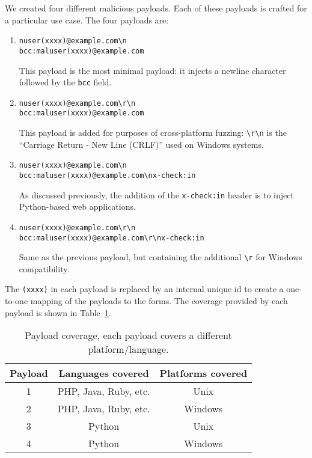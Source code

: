 We created four different malicious payloads. Each of these payloads is crafted for a particular use case. The four payloads are:

\begin{enumerate}
	\item
	\texttt{nuser(xxxx)@example.com\textbackslash{}n\\bcc:maluser(xxxx)@example.com} 
	
	This payload is the most minimal payload: it injects a newline character followed by the \texttt{bcc} field.
	
	\item \texttt{nuser(xxxx)@example.com\textbackslash{}r\textbackslash{}n\\bcc:maluser(xxxx)@example.com}
	
	This payload is added for purposes of cross-platform fuzzing: \texttt{\textbackslash{}r\textbackslash{}n} is the ``Carriage Return - New Line (CRLF)'' used on Windows systems.~\cite{rfc2616}
	
	\item \texttt{nuser(xxxx)@example.com\textbackslash{}n\\bcc:maluser(xxxx)@example.com\textbackslash{}nx-check:in}
	
	As discussed previously, the addition of the \texttt{x-check:in} header is to inject Python-based web applications.
	
	\item \texttt{nuser(xxxx)@example.com\textbackslash{}r\textbackslash{}n\\bcc:maluser(xxxx)@example.com\textbackslash{}r\textbackslash{}nx-check:in}
	
	Same as the previous payload, but containing the additional \texttt{\textbackslash{}r} for Windows compatibility.
	
\end{enumerate}
The \texttt{(xxxx)} in each payload is replaced by an internal unique id to create a one-to-one mapping of the payloads to the forms.
The coverage provided by each payload is shown in Table~\ref{tab:payloadcov}.\\

\begin{table}[tbp]
	\centering
	\begin{tabular}{|c|c|c|}
		\hline
		\multicolumn{1}{|c|}{\textbf{Payload}} & \multicolumn{1}{c}{\textbf{Languages covered}} & \multicolumn{1}{|c|}{\textbf{Platforms covered}}\\
		\hline
		1 & PHP, Java, Ruby, etc. & Unix\\
		\hline
		2 & PHP, Java, Ruby, etc. & Windows\\
		\hline
		3 & Python & Unix\\
		\hline
		4 & Python & Windows\\
		\hline
	\end{tabular}
	\caption[]{Payload coverage, each payload covers a different platform/language.}
	\label{tab:payloadcov}
\end{table}


